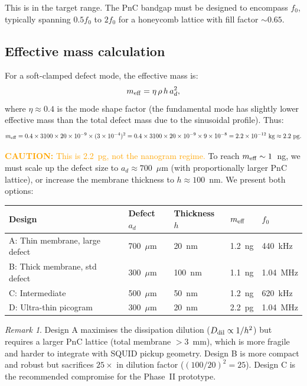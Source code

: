 \documentclass[11pt]{article}
\theoremstyle{definition}
\theoremstyle{remark}
\newtheorem{remark}[theorem]{Remark}
\newcommand{\ee}[1]{\times 10^{#1}}
\newcommand{\caution}[1]{\textcolor{orange}{\textbf{CAUTION:} #1}}
\begin{document}
This is in the target range. The PnC bandgap must be designed to
encompass $f_0$, typically spanning $0.5f_0$ to $2f_0$ for a
honeycomb lattice with fill factor $\sim 0.65$.

\subsection{Effective mass calculation}

For a soft-clamped defect mode, the effective mass is:
\begin{equation}
  m_{\rm eff} = \eta\,\rho\,h\,a_d^2,
  \label{eq:meff}
\end{equation}
where $\eta \approx 0.4$ is the mode shape factor (the fundamental mode
has slightly lower effective mass than the total defect mass due to the
sinusoidal profile). Thus:
\begin{equation}
  m_{\rm eff} = 0.4 \times 3100 \times 20\ee{-9} \times (3\ee{-4})^2
  = 0.4 \times 3100 \times 20\ee{-9} \times 9\ee{-8}
  = 2.2\ee{-12}~\text{kg}
  \approx 2.2~\text{pg}.
  \label{eq:meff_calc_pg}
\end{equation}

\caution{This is 2.2~pg, not the nanogram regime.} To reach $m_{\rm eff}
\sim 1$~ng, we must scale up the defect size to
$a_d \approx 700$~$\mu$m (with proportionally larger PnC lattice), or
increase the membrane thickness to $h \approx 100$~nm. We present both
options:

\begin{center}
\renewcommand{\arraystretch}{1.3}
\begin{tabular}{lllll}
\toprule
Design & Defect $a_d$ & Thickness $h$ & $m_{\rm eff}$ & $f_0$ \\
\midrule
A: Thin membrane, large defect & 700~$\mu$m & 20~nm & 1.2~ng & 440~kHz \\
B: Thick membrane, std defect & 300~$\mu$m & 100~nm & 1.1~ng & 1.04~MHz \\
C: Intermediate & 500~$\mu$m & 50~nm & 1.2~ng & 620~kHz \\
\midrule
D: Ultra-thin picogram & 300~$\mu$m & 20~nm & 2.2~pg & 1.04~MHz \\
\bottomrule
\end{tabular}
\end{center}

\begin{remark}
Design A maximises the dissipation dilution ($D_{\rm dil} \propto 1/h^2$)
but requires a larger PnC lattice (total membrane $>3$~mm), which is
more fragile and harder to integrate with SQUID pickup geometry.
Design B is more compact and robust but sacrifices $25\times$ in dilution
factor ($(100/20)^2 = 25$). Design C is the recommended compromise for
the Phase~II prototype.
\end{remark}
\end{document}
